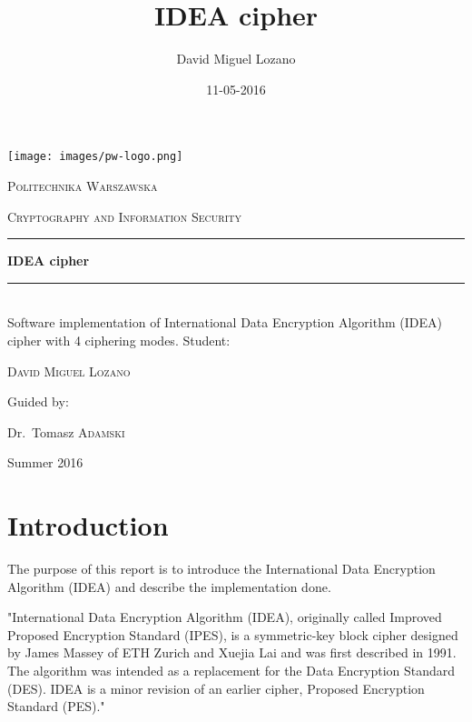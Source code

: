 \documentclass[a4paper,12pt,titlepage]{article}
\newcommand{\HRule}[1]{\rule{\linewidth}{#1}}
\begin{document}
\author{David Miguel Lozano}
\title{IDEA cipher}
\date{11-05-2016}

\begin{titlepage}
	\centering
	\texttt{[image: images/pw-logo.png]}\par
	\vspace{0.3cm}
	{\scshape\LARGE Politechnika Warszawska \par}
	\vfill
	{\scshape\Large Cryptography and Information Security \par}
	\HRule{2pt}
	{\huge\bfseries IDEA cipher \par}
	\HRule{2pt}
	\\ [0.5cm]
	{Software implementation of International Data Encryption Algorithm (IDEA) cipher with 4 ciphering modes.}
	\vfill
	Student:\par
	{\Large\scshape David Miguel Lozano \par}
	\vfill
	Guided by:\par
	Dr.~Tomasz \textsc{Adamski}
	\vfill
	{\large Summer 2016 \par}
\end{titlepage}

\newpage
\tableofcontents
\begin{appendix}
  \listoffigures
\end{appendix}

\newpage

\section{Introduction}

The purpose of this report is to introduce the International Data Encryption Algorithm (IDEA) and describe the implementation done.

"International Data Encryption Algorithm (IDEA), originally called Improved Proposed Encryption Standard (IPES), is a symmetric-key block cipher designed by James Massey of ETH Zurich and Xuejia Lai and was first described in 1991. The algorithm was intended as a replacement for the Data Encryption Standard (DES). IDEA is a minor revision of an earlier cipher, Proposed Encryption Standard (PES)."  \citep{wiki:idea}
\end{document}
